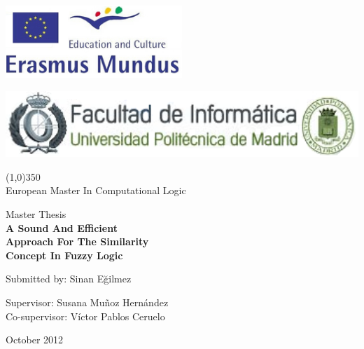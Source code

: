 
\begin{titlepage}
\centering

\includegraphics[width=0.5\textwidth]{erasmusMundus.png}

\includegraphics[width=1\textwidth]{logofi.png}
\begin{center}
\line(1,0){350}\\
European Master In Computational Logic
\end{center}

\vfill



{\large Master Thesis}\\
\vspace{1cm}
{\huge {\sffamily\bfseries A Sound And Efficient } } \\
\vspace{0.3cm}
{\huge{ \sffamily\bfseries Approach For The Similarity} } \\
\vspace{0.3cm}
{\huge{ \sffamily\bfseries  Concept  In Fuzzy Logic} }


\vfill

{\Large Submitted by: Sinan E\u{g}ilmez}

\vspace{1cm}
{\Large Supervisor: Susana Mu\~noz Hern\'andez }\\
{\Large Co-supervisor: V\'ictor Pablos Ceruelo } \\
\vspace{1cm}

{\Large October 2012}
\cleardoublepage
\end{titlepage}
